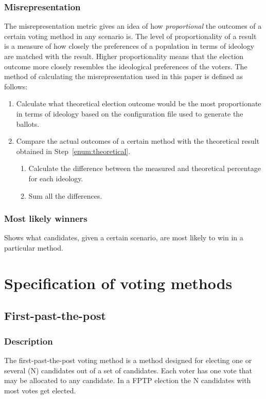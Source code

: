 \documentclass[12pt]{article}
\begin{document}
\subsubsection{Misrepresentation}
The misrepresentation metric gives an idea of how \textit{proportional} the outcomes of a certain voting method in any scenario is. The level of proportionality of a result is a measure of how closely the preferences of a population in terms of ideology are matched with the result. Higher proportionality means that the election outcome more closely resembles the ideological preferences of the voters. The method of calculating the misrepresentation used in this paper is defined as follows:
\begin{enumerate}
	\item Calculate what theoretical election outcome would be the most proportionate in terms of ideology based on the configuration file used to generate the ballots.\label{enum:theoretical}
	\item Compare the actual outcomes of a certain method with the theoretical result obtained in Step~\ref{enum:theoretical}.
	\begin{enumerate}
		\item Calculate the difference between the measured and theoretical percentage for each ideology.
		\item Sum all the differences.
	\end{enumerate}
\end{enumerate}
\subsubsection{Most likely winners}
Shows what candidates, given a certain scenario, are most likely to win in a particular method.
\pagebreak
\section{Specification of voting methods}
\subsection{First-past-the-post}
\subsubsection{Description}
The first-past-the-post voting method is a method designed for electing one or several (N) candidates out of a set of candidates. Each voter has one vote that may be allocated to any candidate. In a FPTP election the N candidates with most votes get elected.
\end{document}
